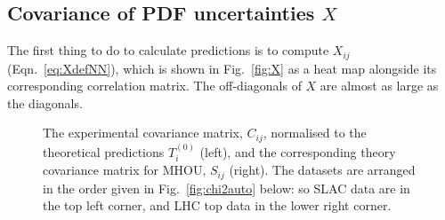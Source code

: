 \subsection{Covariance of PDF uncertainties $X$}
\label{subsec:XnY}
The first thing to do to calculate predictions is to compute $X_{ij}$ (Eqn.~\ref{eq:XdefNN}), which is shown in Fig.~\ref{fig:X} as a heat map alongside its corresponding correlation matrix. The off-diagonals of $X$ are almost as large as the diagonals. 
 \begin{figure}[H]
    \begin{center}
    \end{center}
  \vspace{-0.55cm}
  \caption{The experimental covariance matrix, $C_{ij}$, normalised to the theoretical predictions $T^{(0)}_i$  (left), and the corresponding theory covariance matrix for MHOU, $S_{ij}$ (right). The datasets are arranged in the order given in Fig.~\ref{fig:chi2auto} below: so SLAC data are in the top left corner, and LHC top data in the lower right corner.}
  \label{fig:CnS}
\end{figure}
